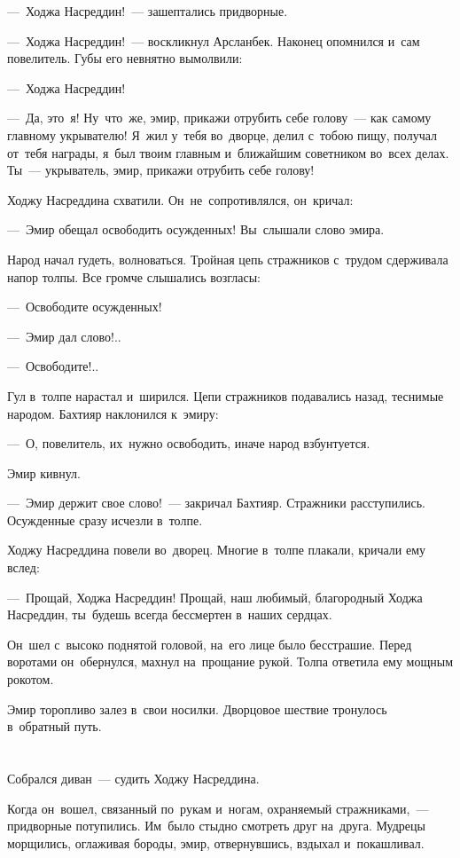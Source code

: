 \documentclass[12pt,a4paper]{book}
\begin{document}
—~Ходжа Насреддин!~— зашептались придворные.

—~Ходжа Насреддин!~— воскликнул Арсланбек. Наконец опомнился и~сам повелитель. Губы его невнятно вымолвили:

—~Ходжа Насреддин!

—~Да, это~я! Ну~что~же, эмир, прикажи отрубить себе голову~— как самому главному укрывателю! Я~жил у~тебя во~дворце, делил с~тобою пищу, получал от~тебя награды, я~был твоим главным и~ближайшим советником во~всех делах. Ты~— укрыватель, эмир, прикажи отрубить себе голову!

Ходжу Насреддина схватили. Он~не~сопротивлялся, он~кричал:

—~Эмир обещал освободить осужденных! Вы~слышали слово эмира.

Народ начал гудеть, волноваться. Тройная цепь стражников с~трудом сдерживала напор толпы. Все громче слышались возгласы:

—~Освободите осужденных!

—~Эмир дал слово!..

—~Освободите!..

Гул в~толпе нарастал и~ширился. Цепи стражников подавались назад, теснимые народом. Бахтияр наклонился к~эмиру:

—~О, повелитель, их~нужно освободить, иначе народ взбунтуется.

Эмир кивнул.

—~Эмир держит свое слово!~— закричал Бахтияр. Стражники расступились. Осужденные сразу исчезли в~толпе.

Ходжу Насреддина повели во~дворец. Многие в~толпе плакали, кричали ему вслед:

—~Прощай, Ходжа Насреддин! Прощай, наш любимый, благородный Ходжа Насреддин, ты~будешь всегда бессмертен в~наших сердцах.

Он~шел с~высоко поднятой головой, на~его лице было бесстрашие. Перед воротами он~обернулся, махнул на~прощание рукой. Толпа ответила ему мощным рокотом.

Эмир торопливо залез в~свои носилки. Дворцовое шествие тронулось в~обратный путь.


\chapter{}

Собрался диван~— судить Ходжу Насреддина.

Когда он~вошел, связанный по~рукам и~ногам, охраняемый стражниками,~— придворные потупились. Им~было стыдно смотреть друг на~друга. Мудрецы морщились, оглаживая бороды, эмир, отвернувшись, вздыхал и~покашливал.
\end{document}
